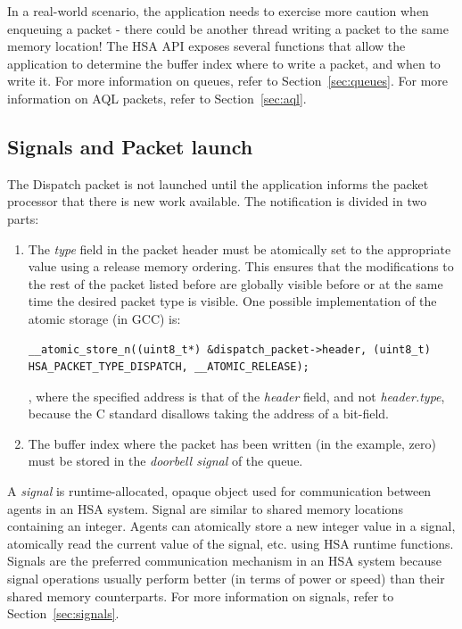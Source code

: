 \documentclass[final]{book}
\newcommand{\reffld}[1]{\textit{#1}}
\begin{document}
In a real-world scenario, the application needs to exercise more caution when
enqueuing a packet - there could be another thread writing a packet to the same
memory location! The HSA API exposes several functions that allow the
application to determine the buffer index where to write a packet, and when to
write it. For more information on queues, refer to Section~\ref{sec:queues}. For
more information on AQL packets, refer to Section~\ref{sec:aql}.

\subsection{Signals and Packet launch}
The Dispatch packet is not launched until the application informs the packet
processor that there is new work available. The notification is divided in two
parts:

\begin{enumerate}
\item The \reffld{type} field in the packet header must be atomically
set to the appropriate value using a release memory ordering. This ensures that
the modifications to the rest of the packet listed before are globally visible
before or at the same time the desired packet type is visible. One possible
implementation of the atomic storage (in GCC) is:
\begin{lstlisting}
__atomic_store_n((uint8_t*) &dispatch_packet->header, (uint8_t) HSA_PACKET_TYPE_DISPATCH, __ATOMIC_RELEASE);
\end{lstlisting}
, where the specified address is that of the \reffld{header} field, and not
\reffld{header.type}, because the C standard disallows taking the address of a
bit-field.
\item The buffer index where the packet has been written (in the example, zero)
must be stored in the \textit{doorbell signal} of the queue.
\end{enumerate}

A \emph{signal} is runtime-allocated, opaque object used for communication
between agents in an HSA system. Signal are similar to shared memory locations
containing an integer. Agents can atomically store a new integer value in a
signal, atomically read the current value of the signal, etc. using HSA runtime
functions.  Signals are the preferred communication mechanism in an HSA system
because signal operations usually perform better (in terms of power or speed)
than their shared memory counterparts. For more information on signals, refer to
Section~\ref{sec:signals}.
\end{document}
